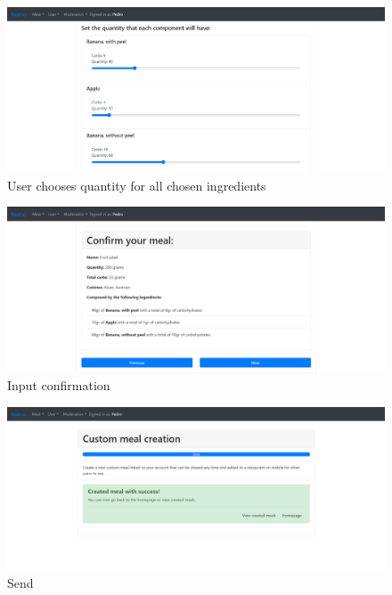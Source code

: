 \begin{figure}[H]
    \begin{center}
        \includegraphics[scale=0.4]{_figures/custom-3.png}
        \caption{User chooses quantity for all chosen ingredients}
    \end{center}
\end{figure}

\begin{figure}[H]
    \begin{center}
        \includegraphics[scale=0.4]{_figures/custom-4.png}
        \caption{Input confirmation}
    \end{center}
\end{figure}

\begin{figure}[H]
    \begin{center}
        \includegraphics[scale=0.4]{_figures/custom-5.png}
        \caption{Send}
    \end{center}
\end{figure}

